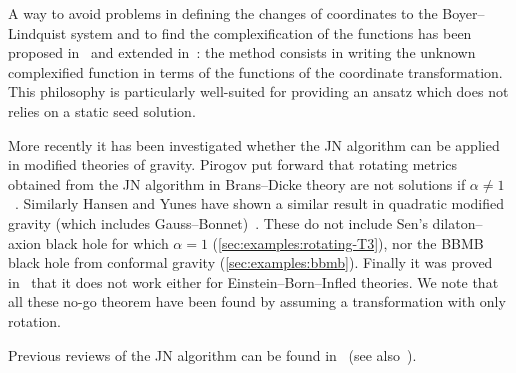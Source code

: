 A way to avoid problems in defining the changes of coordinates to the Boyer--Lindquist system and to find the complexification of the functions has been proposed in~\cite{Drake:2000:UniquenessNewmanJanisAlgorithm} and extended in~\cite{AzregAinou:2014:GeneratingRotatingRegular}: the method consists in writing the unknown complexified function in terms of the functions of the coordinate transformation.
This philosophy is particularly well-suited for providing an ansatz which does not relies on a static seed solution.

More recently it has been investigated whether the JN algorithm can be applied in modified theories of gravity.
Pirogov put forward that rotating metrics obtained from the JN algorithm in Brans--Dicke theory are not solutions if $\alpha \neq 1$~\cite{Pirogov:2013:RotatingScalarvacuumBlack}.
Similarly Hansen and Yunes have shown a similar result in quadratic modified gravity (which includes Gauss--Bonnet)~\cite{Hansen:2013:ApplicabilityNewmanJanisAlgorithm}.\footnotemark{}%
These do not include Sen's dilaton--axion black hole for which $\alpha = 1$ (\cref{sec:examples:rotating-T3}), nor the BBMB black hole from conformal gravity (\cref{sec:examples:bbmb}).
Finally it was proved in~\cite{CiriloLombardo:2006:NewmanJanisAlgorithmRotating} that it does not work either for Einstein--Born--Infled theories.\footnotemark{}%
We note that all these no-go theorem have been found by assuming a transformation with only rotation.


Previous reviews of the JN algorithm can be found in~\cites{Adamo:2014:KerrNewmanMetricReview}[chap.~19]{DInverno:1992:IntroducingEinsteinsRelativity}{Drake:2000:UniquenessNewmanJanisAlgorithm}[sec.~5.4]{Whisker:2008:BraneworldBlackHoles} (see also~\cite{Reed:1974:ImaginaryTetradtransformationsEinstein}).


